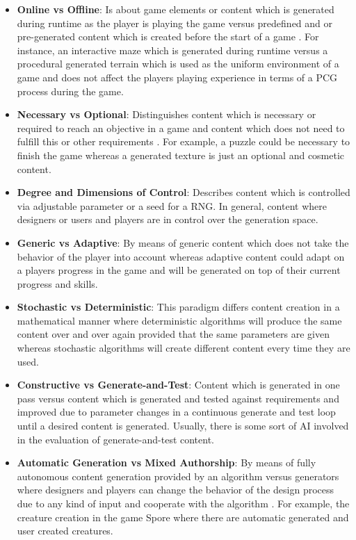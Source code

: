 \documentclass[MGS,Master,english]{twbook}%
\begin{document}
\begin{itemize}
	\item \textbf{Online vs Offline}: Is about game elements or content which is generated during runtime as the player is playing the game versus predefined and or pre-generated content which is created before the start of a game \cite{pcg::book}. For instance, an interactive maze which is generated during runtime versus a procedural generated terrain which is used as the uniform environment of a game and does not affect the players playing experience in terms of a PCG process during the game.
	\item \textbf{Necessary vs Optional}: Distinguishes content which is necessary or required to reach an objective in a game and content which does not need to fulfill this or other requirements \cite{pcg::book}. For example, a puzzle could be necessary to finish the game whereas a generated texture is just an optional and cosmetic content.
	\item \textbf{Degree and Dimensions of Control}: Describes content which is controlled via adjustable parameter or a seed for a \ac{RNG}. In general, content where designers or users and players are in control over the generation space. \cite{pcg::book}
	\item \textbf{Generic vs Adaptive}: By means of generic content which does not take the behavior of the player into account whereas adaptive content could adapt on a players progress in the game and will be generated on top of their current progress and skills. \cite{pcg::book}
	\item \textbf{Stochastic vs Deterministic}: This paradigm differs content creation in a mathematical manner where deterministic algorithms will produce the same content over and over again provided that the same parameters are given whereas stochastic algorithms will create different content every time they are used. \cite{pcg::book}
	\item \textbf{Constructive vs Generate-and-Test}: Content which is generated in one pass versus content which is generated and tested against requirements and improved due to parameter changes in a continuous generate and test loop until a desired content is generated. Usually, there is some sort of \ac{AI} involved in the evaluation of generate-and-test content. \cite{pcg::book}
	\item \textbf{Automatic Generation vs Mixed Authorship}: By means of fully autonomous content generation provided by an algorithm versus generators where designers and players can change the behavior of the design process due to any kind of input and cooperate with the algorithm \cite{pcg::book}. For example, the creature creation in the game Spore \cite{game::spore} where there are automatic generated and user created creatures.
\end{itemize}
\end{document}
